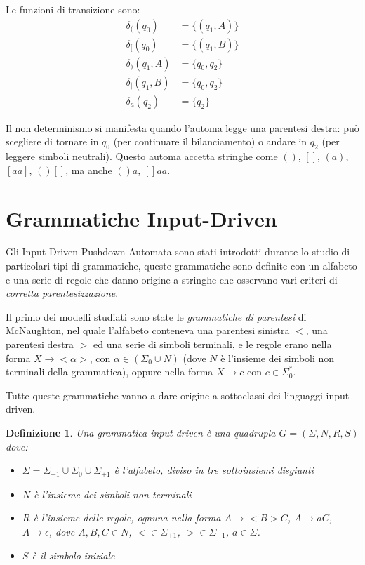\documentclass[a4paper,12pt]{report}
\newtheorem{definition}{Definizione}[chapter]
\theoremstyle{propositionstyle}
\begin{document}
    Le funzioni di transizione sono:
    \begin{align}
        \delta_{(}(q_0) &= \{(q_1, A)\} \\
        \delta_{[}(q_0) &= \{(q_1, B)\} \\
        \delta_{)}(q_1, A) &= \{q_0, q_2\} \\
        \delta_{]}(q_1, B) &= \{q_0, q_2\} \\
        \delta_{a}(q_2) &= \{q_2\}
    \end{align}

    Il non determinismo si manifesta quando l'automa legge una parentesi destra: può scegliere di tornare in $q_0$ (per continuare il bilanciamento) o andare in $q_2$ (per leggere simboli neutrali).
    Questo automa accetta stringhe come $()$, $[]$, $(a)$, $[aa]$, $()[]$, ma anche $()a$, $[]aa$.


    \section{Grammatiche Input-Driven}

    Gli Input Driven Pushdown Automata sono stati introdotti durante lo studio di particolari tipi di grammatiche, queste grammatiche sono definite
    con un alfabeto e una serie di regole che danno origine a stringhe che osservano vari criteri di \textit{corretta parentesizzazione}.

    Il primo dei modelli studiati sono state le \textit{grammatiche di parentesi} di McNaughton, nel quale l'alfabeto conteneva una parentesi sinistra $<$, una parentesi destra $>$
    ed una serie di simboli terminali, e le regole erano nella forma $X \rightarrow <\alpha>$, con $\alpha \in \left(\Sigma_0 \cup N\right)$ (dove $N$ è l'insieme dei simboli non terminali della grammatica), oppure nella forma $X \rightarrow c$ con $c \in \Sigma_0^*$.

    Tutte queste grammatiche vanno a dare origine a sottoclassi dei linguaggi input-driven.

    \begin{definition}
        Una grammatica input-driven è una quadrupla $G = \left(\Sigma, N, R, S\right)$ dove:
        \begin{itemize}
            \item $\Sigma = \Sigma_{-1} \cup \Sigma_0 \cup \Sigma_{+1}$ è l'alfabeto, diviso in tre sottoinsiemi disgiunti
            \item $N$ è l'insieme dei simboli non terminali
            \item $R$ è l'insieme delle regole, ognuna nella forma $A \rightarrow <B>C$, $A \rightarrow aC$, $A \rightarrow \epsilon$, dove $A, B, C \in N$, $< \in \Sigma_{+1}$, $> \in \Sigma_{-1}$, $a \in \Sigma$.
            \item $S$ è il simbolo iniziale
        \end{itemize}
    \end{definition}
\end{document}
